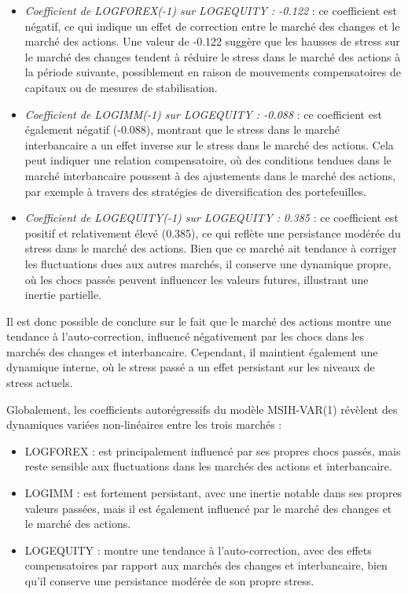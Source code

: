 \begin{itemize}
    \item \textit{Coefficient de LOGFOREX(-1) sur LOGEQUITY : -0.122} : ce coefficient est négatif, ce qui indique un effet de correction entre le marché des changes et le marché des actions. Une valeur de -0.122 suggère que les hausses de stress sur le marché des changes tendent à réduire le stress dans le marché des actions à la période suivante, possiblement en raison de mouvements compensatoires de capitaux ou de mesures de stabilisation.
    \item \textit{Coefficient de LOGIMM(-1) sur LOGEQUITY : -0.088} : ce coefficient est également négatif (-0.088), montrant que le stress dans le marché interbancaire a un effet inverse sur le stress dans le marché des actions. Cela peut indiquer une relation compensatoire, où des conditions tendues dans le marché interbancaire poussent à des ajustements dans le marché des actions, par exemple à travers des stratégies de diversification des portefeuilles.
    \item \textit{Coefficient de LOGEQUITY(-1) sur LOGEQUITY : 0.385} : ce coefficient est positif et relativement élevé (0.385), ce qui reflète une persistance modérée du stress dans le marché des actions. Bien que ce marché ait tendance à corriger les fluctuations dues aux autres marchés, il conserve une dynamique propre, où les chocs passés peuvent influencer les valeurs futures, illustrant une inertie partielle.
\end{itemize}

Il est donc possible de conclure sur le fait que le marché des actions montre une tendance à l'auto-correction, influencé négativement par les chocs dans les marchés des changes et interbancaire. Cependant, il maintient également une dynamique interne, où le stress passé a un effet persistant sur les niveaux de stress actuels.

\vspace{0.5cm}

Globalement, les coefficients autorégressifs du modèle MSIH-VAR(1) révèlent des dynamiques variées non-linéaires entre les trois marchés :

\begin{itemize}
    \item LOGFOREX : est principalement influencé par ses propres chocs passés, mais reste sensible aux fluctuations dans les marchés des actions et interbancaire.
    \item LOGIMM : est fortement persistant, avec une inertie notable dans ses propres valeurs passées, mais il est également influencé par le marché des changes et le marché des actions.
    \item LOGEQUITY : montre une tendance à l'auto-correction, avec des effets compensatoires par rapport aux marchés des changes et interbancaire, bien qu'il conserve une persistance modérée de son propre stress.
\end{itemize}

